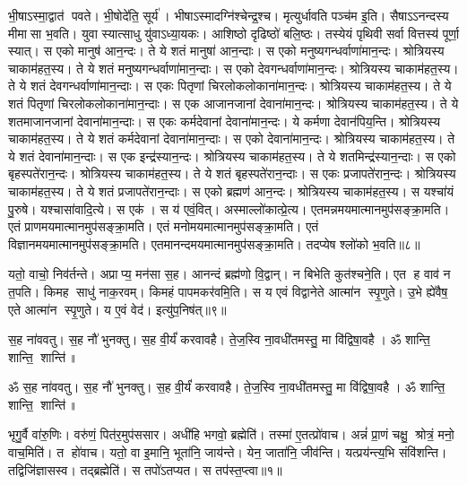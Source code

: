 भी॒षाऽस्मा॒द्वात॑ पवते। भी॒षोदे॑ति॒ सूर्य॑। भीषाऽस्मादग्नि॑\-श्चेन्द्र॒श्च। मृत्युर्धावति पञ्च॑म इ॒ति। सैषाऽऽनन्दस्य मीमासा भ॒वति। युवा स्यात्साधु यु॑वाऽध्या॒यकः। आशिष्ठो दृढिष्ठो॑ बलि॒ष्ठः। तस्येयं पृथिवी सर्वा वित्तस्य॑ पूर्णा॒ स्यात्। स एको मानुष॑ आन॒न्दः। ते ये शतं मानुषा॑ आन॒न्दाः। स एको मनुष्यगन्धर्वाणा॑मान॒न्दः। श्रोत्रियस्य चाकाम॑हत॒स्य। ते ये शतं मनुष्यगन्धर्वाणा॑मान॒न्दाः। स एको देवगन्धर्वाणा॑मान॒न्दः। श्रोत्रियस्य चाकाम॑हत॒स्य। ते ये शतं देवगन्धर्वाणा॑मान॒न्दाः। स एकः पितृणां चिरलोकलोकाना॑मान॒न्दः। श्रोत्रियस्य चाकाम॑हत॒स्य। ते ये शतं पितृणां चिरलोकलोकाना॑\-मान॒न्दाः। स एक आजानजानां देवाना॑मान॒न्दः। श्रोत्रियस्य चाकाम॑हत॒स्य। ते ये शतमाजानजानां देवाना॑मान॒न्दाः। स एकः कर्मदेवानां देवाना॑मान॒न्दः। ये कर्मणा देवान॑पिय॒न्ति। श्रोत्रियस्य चाकाम॑हत॒स्य। ते ये शतं कर्मदेवानां देवाना॑मान॒न्दाः। स एको देवाना॑मान॒न्दः। श्रोत्रियस्य चाकाम॑हत॒स्य। ते ये शतं देवाना॑मान॒न्दाः। स एक इन्द्र॑स्यान॒न्दः। श्रोत्रियस्य चाकाम॑हत॒स्य। ते ये शतमिन्द्र॑स्यान॒न्दाः। स एको बृहस्पते॑रान॒न्दः। श्रोत्रियस्य चाकाम॑हत॒स्य। ते ये शतं बृहस्पते॑रान॒न्दाः। स एकः प्रजापते॑रान॒न्दः। श्रोत्रियस्य चाकाम॑हत॒स्य। ते ये शतं प्रजापते॑रान॒न्दाः। स एको ब्रह्मण॑ आन॒न्दः। श्रोत्रियस्य चाकाम॑हत॒स्य। स यश्चा॑यं पु॒रुषे। यश्चासा॑वादि॒त्ये। स एक॑। स य॑ एवं॒वित्। अस्माल्लो॑कात्प्रे॒त्य। एतमन्नमयमात्मानमुप॑सङ्क्रा॒मति। एतं प्राणमयमात्मानमुप॑सङ्क्रा॒मति। एतं मनोमयमात्मानमुप॑\-सङ्क्रा॒मति। एतं विज्ञानमयमात्मानमुप॑\-सङ्क्रा॒मति। एतमानन्द\-मयमात्मानमुप॑\-सङ्क्रा॒मति। तदप्येष श्लो॑को भ॒वति॥८॥

यतो॒ वाचो॒ निव॑र्तन्ते। अप्राप्य॒ मन॑सा स॒ह। आनन्दं ब्रह्म॑णो वि॒द्वान्। न बिभेति कुत॑श्चने॒ति। एत ह वाव॑ न त॒पति। किमह साधु॑ नाक॒रवम्। किमहं पापमकर॑वमि॒ति। स य एवं  विद्वानेते आत्मा॑न स्पृ॒णुते। उ॒भे ह्ये॑वैष॒ एते आत्मा॑न स्पृ॒णुते। य ए॒वं वेद॑। इत्यु॑प॒निष॑त्॥९॥

स॒ह ना॑ववतु। स॒ह नौ॑ भुनक्तु। स॒ह वी॒र्यं॑ करवावहै। ते॒ज॒स्वि ना॒वधी॑तमस्तु॒ मा वि॑द्विषा॒वहै। ॐ शान्ति॒ शान्ति॒ शान्ति॑॥

\closesection
\clearpage

\setcounter{anuvakam}{0}
ॐ स॒ह ना॑ववतु। स॒ह नौ॑ भुनक्तु। स॒ह वी॒र्यं॑ करवावहै। ते॒ज॒स्वि ना॒वधी॑तमस्तु॒ मा वि॑द्विषा॒वहै। ॐ शान्ति॒ शान्ति॒ शान्ति॑॥


भृगु॒र्वै वा॑रु॒णिः। वरु॑णं॒ पित॑र॒मुप॑ससार। अधी॑हि भगवो॒ ब्रह्मेति॑। तस्मा॑ ए॒तत्प्रो॑वाच। अन्नं॑ प्रा॒णं चक्षु॒ श्रोत्रं॒ मनो॒ वाच॒मिति॑। त हो॑वाच। यतो॒ वा इ॒मानि॒ भूता॑नि॒ जाय॑न्ते। येन॒ जाता॑नि॒ जीव॑न्ति। यत्प्रय॑न्त्य॒भि संवि॑शन्ति। तद्विजि॑ज्ञासस्व। तद्ब्रह्मेति॑। स तपो॑ऽतप्यत। स तप॑स्त॒प्त्वा॥१॥

